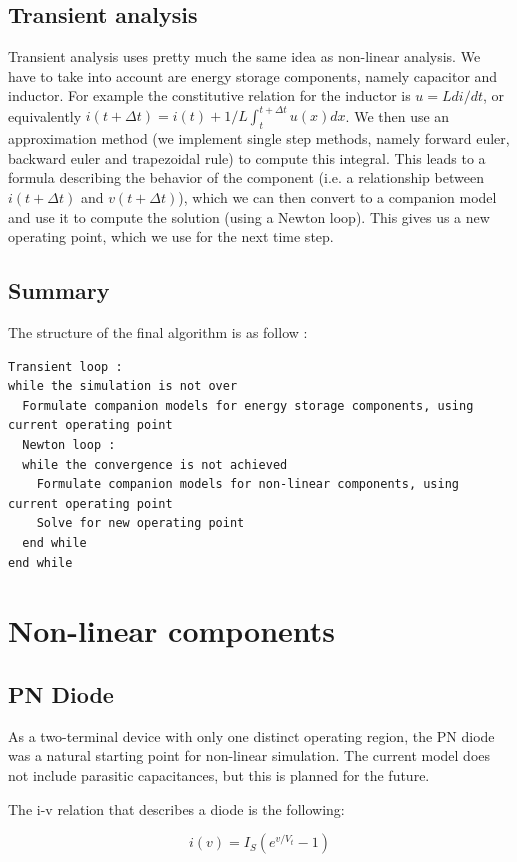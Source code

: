\documentclass{article}
\begin{document}
\subsection{Transient analysis}
Transient analysis uses pretty much the same idea as non-linear analysis. We have to take into account are energy storage components, namely capacitor and inductor. For example the constitutive relation for the inductor is $u = L di/dt$, or equivalently $i(t+\Delta t) = i(t) + 1/L \int_t^{t+\Delta t} u(x) dx$. We then use an approximation method (we implement single step methods, namely forward euler, backward euler and trapezoidal rule) to compute this integral. This leads to a formula describing the behavior of the component (i.e. a relationship between $i(t+\Delta t)$ and $v(t+\Delta t)$), which we can then convert to a companion model and use it to compute the solution (using a Newton loop). This gives us a new operating point, which we use for the next time step.
\subsection{Summary}
The structure of the final algorithm is as follow :
\begin{lstlisting}
Transient loop :
while the simulation is not over
  Formulate companion models for energy storage components, using current operating point
  Newton loop :
  while the convergence is not achieved
    Formulate companion models for non-linear components, using current operating point
    Solve for new operating point
  end while
end while
\end{lstlisting}
\section{Non-linear components}
\subsection{PN Diode}

As a two-terminal device with only one distinct operating region, the PN diode was a natural starting point for non-linear simulation.  The current model does not include parasitic capacitances, but this is planned for the future.

The i-v relation that describes a diode is the following:

\begin{equation}
i(v) = I_S(e^{v/V_t}-1)
\end{equation}
\end{document}
